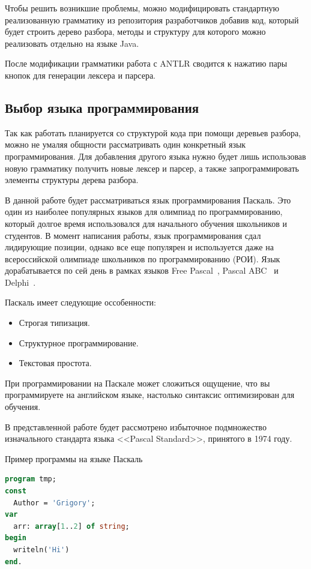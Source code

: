Чтобы решить возникшие проблемы, можно модифицировать стандартную реализованную грамматику из репозитория разработчиков
добавив код, который будет строить дерево разбора, методы и структуру для которого можно реализовать отдельно на языке
Java.

После модификации грамматики работа с ANTLR сводится к нажатию пары кнопок для генерации лексера и парсера. 

\subsection{Выбор языка программирования}

Так как работать планируется со структурой кода при помощи деревьев разбора, можно не умаляя общности рассматривать один
конкретный язык программирования. Для добавления другого языка нужно будет лишь использовав новую грамматику получить новые лексер
и парсер, а также запрограммировать элементы структуры дерева разбора.

В данной работе будет рассматриваться язык программирования Паскаль. Это один из наиболее популярных языков для олимпиад
по программированию, который долгое время использовался для начального обучения школьников и студентов. В момент написания
работы, язык программирования сдал лидирующие позиции, однако все еще популярен и используется даже на всероссийской олимпиаде
школьников по программированию (РОИ). Язык дорабатывается по сей день в рамках языков Free Pascal~\cite{free-pascal}, 
Pascal ABC~\cite{pascal-abc} и Delphi~\cite{delphi}.

Паскаль имеет следующие оссобенности:
\begin{itemize}
    \item Строгая типизация.
    \item Структурное программирование.
    \item Текстовая простота.
\end{itemize}

При программировании на Паскале может сложиться ощущение, что вы программируете на английском языке, настолько синтаксис оптимизирован
для обучения.

В представленной работе будет рассмотрено избыточное подмножество изначального стандарта языка 
<<Pascal Standard>>, принятого в 1974 году.

\begin{algorithm}[!h] 
\caption{Пример программы на языке Паскаль}\label{lst1} 
\begin{lstlisting}[language=pascal]
program tmp;
const
  Author = 'Grigory';
var
  arr: array[1..2] of string;
begin
  writeln('Hi')
end.
\end{lstlisting} 
\end{algorithm}

